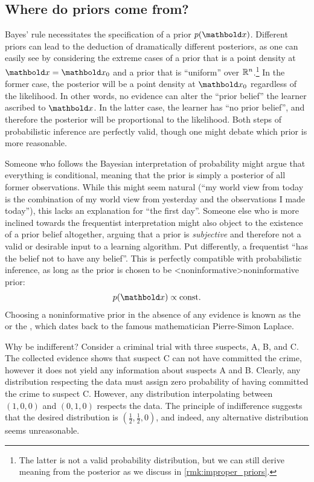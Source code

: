 \subsection{Where do priors come from?}\label{sec:fundamentals:inference:priors}

Bayes' rule necessitates the specification of a prior $p(\vx)$.
Different priors can lead to the deduction of dramatically different posteriors, as one can easily see by considering the extreme cases of a prior that is a point density at $\vx = \vx_0$ and a prior that is ``uniform'' over $\mathbb{R}^n$.\footnote{The latter is not a valid probability distribution, but we can still derive meaning from the posterior as we discuss in \cref{rmk:improper_priors}.}
In the former case, the posterior will be a point density at $\vx_0$ regardless of the likelihood.
In other words, no evidence can alter the ``prior belief'' the learner ascribed to $\vx$.
In the latter case, the learner has ``no prior belief'', and therefore the posterior will be proportional to the likelihood.
Both steps of probabilistic inference are perfectly valid, though one might debate which prior is more reasonable.

Someone who follows the Bayesian interpretation of probability might argue that everything is conditional, meaning that the prior is simply a posterior of all former observations.
While this might seem natural (``my world view from today is the combination of my world view from yesterday and the observations I made today''), this lacks an explanation for ``the first day''.
Someone else who is more inclined towards the frequentist interpretation might also object to the existence of a prior belief altogether, arguing that a prior is \emph{subjective} and therefore not a valid or desirable input to a learning algorithm.
Put differently, a frequentist ``has the belief not to have any belief''.
This is perfectly compatible with probabilistic inference, as long as the prior is chosen to be \midx<noninformative>{noninformative prior}:\begin{align}
  p(\vx) \propto \const.
\end{align}
Choosing a noninformative prior in the absence of any evidence is known as the  or the , which dates back to the famous mathematician Pierre-Simon Laplace.

\begin{ex}{Why be indifferent?}{}
  Consider a criminal trial with three suspects, A, B, and C.
  The collected evidence shows that suspect C can not have committed the crime, however it does not yield any information about suspects A and B.
  Clearly, any distribution respecting the data must assign zero probability of having committed the crime to suspect C.
  However, any distribution interpolating between $(1,0,0)$ and $(0,1,0)$ respects the data.
  The principle of indifference suggests that the desired distribution is $(\frac{1}{2}, \frac{1}{2}, 0)$, and indeed, any alternative distribution seems unreasonable.
\end{ex}

